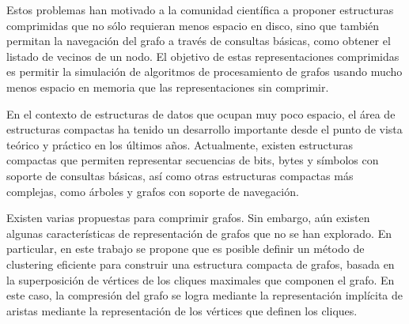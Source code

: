 Estos problemas han motivado a la comunidad científica a proponer estructuras comprimidas que no sólo requieran menos espacio en disco, sino que también permitan la navegación del grafo a través de consultas básicas, como obtener el listado de vecinos de un nodo. El objetivo de estas representaciones comprimidas es permitir la simulación de algoritmos de procesamiento de grafos usando mucho menos espacio en memoria que las representaciones sin comprimir.

En el contexto de estructuras de datos que ocupan muy poco espacio, el área de estructuras compactas ha tenido un desarrollo importante desde el punto de vista teórico y práctico en los últimos años. Actualmente, existen estructuras compactas que permiten representar secuencias de bits, bytes y símbolos con soporte de consultas básicas, así como otras estructuras compactas más complejas, como árboles y grafos con soporte de navegación.

Existen varias propuestas para comprimir grafos. Sin embargo, aún existen algunas características de representación de grafos que no se han explorado. En particular, en este trabajo se propone que es posible definir un método de clustering eficiente para construir una estructura compacta de grafos, basada en la superposición de vértices de los cliques maximales que componen el grafo. En este caso, la compresión del grafo se logra mediante la representación implícita de aristas mediante la representación de los vértices que definen los cliques.

